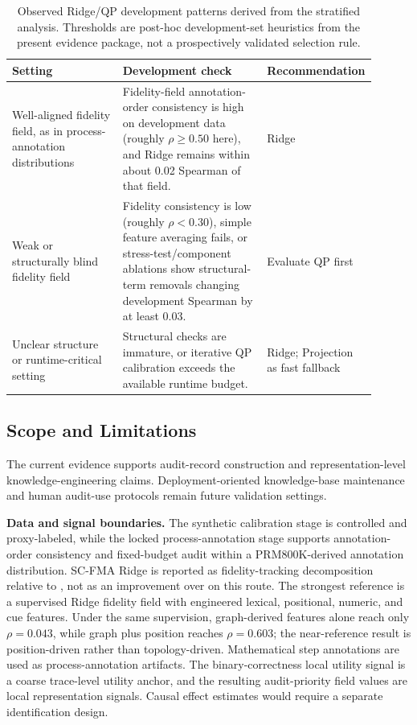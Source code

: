 \begin{table}[ht]
\caption{Observed Ridge/QP development patterns derived from the stratified analysis. Thresholds are post-hoc development-set heuristics from the present evidence package, not a prospectively validated selection rule.}
\label{tab:variant-policy}
\centering
\small
\renewcommand{\arraystretch}{1.08}
\begin{tabular}{Z{0.32\linewidth}Z{0.42\linewidth}Z{0.16\linewidth}}
\toprule
\textbf{Setting} & \textbf{Development check} & \textbf{Recommendation} \\
\midrule
Well-aligned fidelity field, as in process-annotation distributions & Fidelity-field annotation-order consistency is high on development data (roughly $\rho \ge 0.50$ here), and Ridge remains within about 0.02 Spearman of that field. & Ridge \\
Weak or structurally blind fidelity field & Fidelity consistency is low (roughly $\rho < 0.30$), simple feature averaging fails, or stress-test/component ablations show structural-term removals changing development Spearman by at least 0.03. & Evaluate QP first \\
Unclear structure or runtime-critical setting & Structural checks are immature, or iterative QP calibration exceeds the available runtime budget. & Ridge; Projection as fast fallback \\
\bottomrule
\end{tabular}
\end{table}

\subsection{Scope and Limitations}
\label{sec:scope-limitations}

\medskip
\noindent The current evidence supports audit-record construction and representation-level knowledge-engineering claims. Deployment-oriented knowledge-base maintenance and human audit-use protocols remain future validation settings.

\medskip
\noindent\textbf{Data and signal boundaries.} The synthetic calibration stage is controlled and proxy-labeled, while the locked process-annotation stage supports annotation-order consistency and fixed-budget audit within a PRM800K-derived annotation distribution. SC-FMA Ridge is reported as fidelity-tracking decomposition relative to \wstruct{}, not as an improvement over \wstruct{} on this route. The strongest reference is a supervised Ridge fidelity field with engineered lexical, positional, numeric, and cue features. Under the same supervision, graph-derived features alone reach only $\rho=0.043$, while graph plus position reaches $\rho=0.603$; the near-reference result is position-driven rather than topology-driven. Mathematical step annotations are used as process-annotation artifacts. The binary-correctness local utility signal is a coarse trace-level utility anchor, and the resulting audit-priority field values are local representation signals. Causal effect estimates would require a separate identification design.


